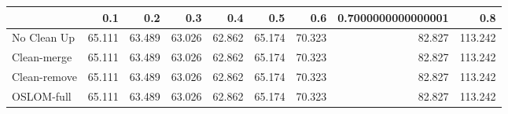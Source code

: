 \begin{tabular}{lrrrrrrrr}
\toprule
{} &    0.1 &    0.2 &    0.3 &    0.4 &    0.5 &    0.6 & 0.7000000000000001 &     0.8 \\
\midrule
No Clean Up  & 65.111 & 63.489 & 63.026 & 62.862 & 65.174 & 70.323 &             82.827 & 113.242 \\
Clean-merge  & 65.111 & 63.489 & 63.026 & 62.862 & 65.174 & 70.323 &             82.827 & 113.242 \\
Clean-remove & 65.111 & 63.489 & 63.026 & 62.862 & 65.174 & 70.323 &             82.827 & 113.242 \\
OSLOM-full   & 65.111 & 63.489 & 63.026 & 62.862 & 65.174 & 70.323 &             82.827 & 113.242 \\
\bottomrule
\end{tabular}
